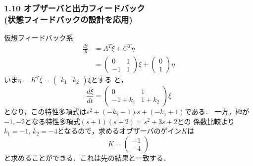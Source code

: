 \begin{frame}[t]
\frametitle{1.10 オブザーバと出力フィードバック \\
(状態フィードバックの設計を応用)}
仮想フィードバック系
\begin{align}
 \frac{d\xi}{dt} &= A^T \xi + C^T \eta \nonumber \\
 &=
 \left(
 \begin{array}{cc}
  0 & 1 \\
  -1 & 1
 \end{array}
 \right) \xi +
 \left(
 \begin{array}{c}
  0 \\
  1
 \end{array}
 \right) \eta
\end{align}
いま$\eta = K^T \xi = (\begin{array}{cc}k_1 & k_2\end{array})\xi$とする
と，
\begin{equation}
 \frac{d\xi}{dt} =
 \left(
 \begin{array}{cc}
  0 & 1 \\
  -1+k_1 & 1 + k_2
 \end{array}
 \right) \xi
\end{equation}
となり，この特性多項式は$s^2 + (-k_2 - 1)s + (-k_1 + 1)$である．
一方，極が$-1, -2$となる特性多項式$(s+1)(s+2) = s^2 + 3s + 2$との
係数比較より$k_1 = -1$, $k_2 = -4$となるので，求めるオブザーバのゲイン$K$は
\[
 K =
 \left(
 \begin{array}{c}
  -1 \\
  -4
 \end{array}
 \right)
\]
と求めることができる．これは先の結果と一致する．
\end{frame}

